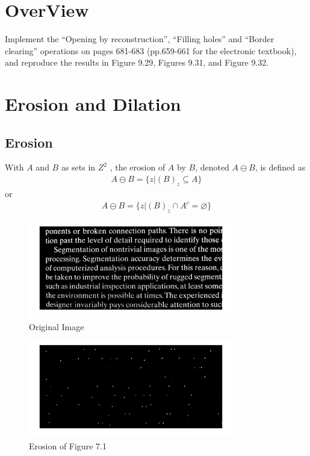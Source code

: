 \documentclass[11pt,oneside]{book}
\begin{document}
\section{OverView}

Implement the “Opening by reconstruction”, “Filling holes” and “Border clearing” operations on pages 681-683 (pp.659-661 for the electronic textbook), and reproduce the results in Figure 9.29, Figures 9.31, and Figure 9.32.

\section{Erosion and Dilation}
\subsection{Erosion}
With $A$ and $B$ as sets in $Z^2$ , the erosion of $A$ by $B$, denoted $A \ominus B$, is defined as
\begin{align}
  A \ominus B = \{z|(B)_z\subseteq A\}
\end{align}
or
\begin{align}
  A \ominus B = \{z|(B)_z\cap A^c = \varnothing\}
\end{align}
\begin{figure}[!htb]
   \centering  
   \includegraphics[width=0.8\textwidth]{images/8/image.jpg}
   \caption{Original Image}
\end{figure}
\begin{figure}[!htb]
   \centering  
   \includegraphics[width=0.8\textwidth]{images/8/image_er.jpg}
   \caption{Erosion of Figure 7.1}
\end{figure}
\newpage
\end{document}
